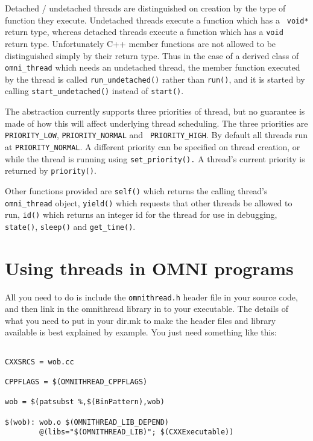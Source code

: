 \documentclass[11pt]{article}
\begin{document}
Detached / undetached threads are distinguished on creation by the type of
function they execute.  Undetached threads execute a function which has a {\tt
void*} return type, whereas detached threads execute a function which has a
{\tt void} return type.  Unfortunately C++ member functions are not allowed to
be distinguished simply by their return type.  Thus in the case of a derived
class of {\tt omni\_thread} which needs an undetached thread, the member
function executed by the thread is called {\tt run\_undetached()} rather than
{\tt run()}, and it is started by calling {\tt start\_undetached()} instead of
{\tt start()}.

The abstraction currently supports three priorities of thread, but no guarantee
is made of how this will affect underlying thread scheduling.  The three
priorities are {\tt PRIORITY\_LOW}, {\tt PRIORITY\_NORMAL} and {\tt
PRIORITY\_HIGH}.  By default all threads run at {\tt PRIORITY\_NORMAL}.  A
different priority can be specified on thread creation, or while the thread is
running using {\tt set\_priority().}  A thread's current priority is returned
by {\tt priority()}.

Other functions provided are {\tt self()} which returns the calling thread's
{\tt omni\_thread} object, {\tt yield()} which requests that other threads be
allowed to run, {\tt id()} which returns an integer id for the thread for use
in debugging, {\tt state()}, {\tt sleep()} and {\tt get\_time()}.


\section{Using threads in OMNI programs}

All you need to do is include the {\tt omnithread.h} header file in your source
code, and then link in the omnithread library in to your executable.  The
details of what you need to put in your dir.mk to make the header files and
library available is best explained by example.  You just need something like
this:

\begin{verbatim}

CXXSRCS = wob.cc

CPPFLAGS = $(OMNITHREAD_CPPFLAGS)

wob = $(patsubst %,$(BinPattern),wob)

$(wob): wob.o $(OMNITHREAD_LIB_DEPEND)
        @(libs="$(OMNITHREAD_LIB)"; $(CXXExecutable))

\end{verbatim}
\end{document}
